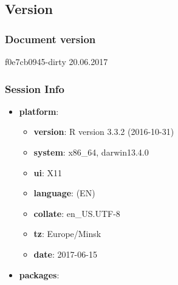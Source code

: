 \documentclass[]{article}
\providecommand{\tightlist}{%
  \setlength{\itemsep}{0pt}\setlength{\parskip}{0pt}}
\begin{document}
\subsection{Version}\label{version}

\subsubsection{Document version}\label{document-version}

f0e7cb0945-dirty 20.06.2017

\subsubsection{Session Info}\label{session-info}

\begin{itemize}
\item
  \textbf{platform}:

  \begin{itemize}
  \tightlist
  \item
    \textbf{version}: R version 3.3.2 (2016-10-31)
  \item
    \textbf{system}: x86\_64, darwin13.4.0
  \item
    \textbf{ui}: X11
  \item
    \textbf{language}: (EN)
  \item
    \textbf{collate}: en\_US.UTF-8
  \item
    \textbf{tz}: Europe/Minsk
  \item
    \textbf{date}: 2017-06-15
  \end{itemize}
\item
  \textbf{packages}:


\end{itemize}
\end{document}
